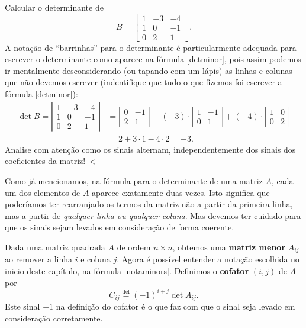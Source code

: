\documentclass[../livro.tex]{subfiles}  %
\begin{document}
\begin{example}
	Calcular o determinante de
	\begin{equation}
	B = \begin{bmatrix}
	1 & -3 & -4  \\
	1 & 0 & -1 \\
	0 & 2 & 1
	\end{bmatrix}.
	\end{equation} A notação de ``barrinhas'' para o determinante é particularmente adequada para escrever o determinante como aparece na fórmula \eqref{detminor}, pois assim podemos ir mentalmente desconsiderando (ou tapando com um lápis) as linhas e colunas que não devemos escrever (indentifique que tudo o que fizemos foi escrever a fórmula \eqref{detminor}):
        \begin{equation}
	\begin{split}
	\det B = \left| \begin{matrix}
	1 & -3 & -4  \\
    1 & 0  & -1  \\
    0 & 2  & 1
	\end{matrix} \right| & = \left| \begin{matrix}
	0 & -1 \\
	2 & 1
	\end{matrix} \right| - (-3) \cdot \left| \begin{matrix}
	1 &  -1 \\
	0 &  1
	\end{matrix} \right| + (-4) \cdot \left| \begin{matrix}
	1 & 0  \\
	0 & 2 
	\end{matrix} \right| \\ & = 2 + 3 \cdot 1  -4 \cdot 2 = -3.
	\end{split}
      \end{equation}
 Analise com atenção como os sinais alternam, independentemente dos sinais dos coeficientes da matriz!$ \ \lhd$
\end{example}


Como já mencionamos, na fórmula para o determinante de uma matriz $A$, cada um dos elementos de $A$ aparece exatamente duas vezes. Isto significa que poderíamos ter rearranjado os termos da matriz não a partir da primeira linha, mas a partir de \textit{qualquer linha ou qualquer coluna}. Mas devemos ter cuidado para que os sinais sejam levados em consideração de forma coerente.

Dada uma matriz quadrada $A$ de ordem $n \times n$, obtemos uma \textbf{matriz menor} $A_{ij}$ ao remover a linha $i$ e coluna $j$. Agora é possível entender a notação escolhida no inicio deste capítulo, na fórmula \eqref{notaminors}. Definimos o \textbf{cofator} $(i,j)$ de $A$ por
\begin{equation}
C_{ij} \stackrel{\text{def}}{=} (-1)^{i + j} \det A_{ij}.
\end{equation} Este sinal $\pm 1$ na definição do cofator é o que faz com que o sinal seja levado em consideração corretamente.
\end{document}
